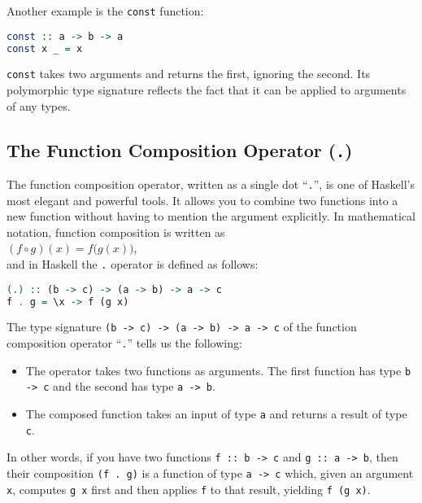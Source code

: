 Another example is the \texttt{const} function:
\begin{lstlisting}[style=haskellstyle, language=Haskell]
const :: a -> b -> a
const x _ = x
\end{lstlisting}
\texttt{const} takes two arguments and returns the first, ignoring the second. Its polymorphic type signature reflects the fact that it can be applied to arguments of any types.

\subsection{The Function Composition Operator (\texttt{.})}
The function composition operator, written as a single dot ``\texttt{.}'', is one of Haskell’s most elegant and
powerful tools. It allows you to combine two functions into a new function without having to mention the
argument explicitly. In mathematical notation, function composition is written as 
\\[0.2cm]
\hspace*{1.3cm}
$(f \circ g)(x) = f\bigl(g(x)\bigr)$,
\\[0.2cm]
and in Haskell the \texttt{.} operator is defined as follows:
\begin{lstlisting}[language=Haskell]
(.) :: (b -> c) -> (a -> b) -> a -> c
f . g = \x -> f (g x)
\end{lstlisting}
The type signature \texttt{(b -> c) -> (a -> b) -> a -> c} of the function composition operator ``\texttt{.}''
tells us the following:
\begin{itemize}
  \item The operator takes two functions as arguments. The first function has type \texttt{b -> c} and the second has type \texttt{a -> b}.
  \item The composed function takes an input of type \texttt{a} and returns a result of type \texttt{c}.
\end{itemize}
In other words, if you have two functions \texttt{f :: b -> c} and \texttt{g :: a -> b}, then their composition
\texttt{(f . g)} is a function of type \texttt{a -> c} which, given an argument \texttt{x}, computes
\texttt{g x} first and then applies \texttt{f} to that result, yielding \texttt{f (g x)}. 
\vspace*{0.2cm}

